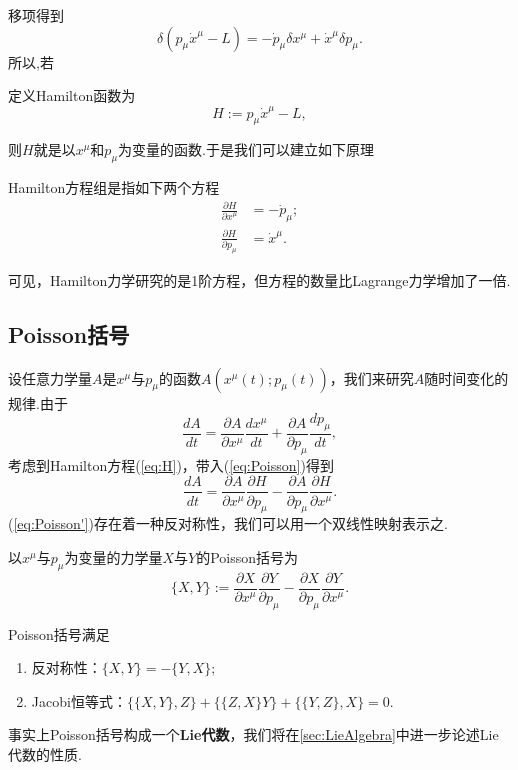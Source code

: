 		移项得到
		\begin{equation}\label{eq:delta H}
		\delta(p_\mu{\dot{x}}^\mu-L)=-{\dot{p}}_\mu\delta x^\mu+{\dot{x}}^\mu\delta p_\mu.
		\end{equation}
		所以,若
		\begin{definition}
		定义Hamilton函数为
		\begin{equation}
			H:=p_\mu{\dot{x}}^\mu-L,
		\end{equation}
		\end{definition}
		则$H$就是以$x^\mu$和$p_\mu$为变量的函数.于是我们可以建立如下原理
		\begin{theorem}
		Hamilton方程组是指如下两个方程
		\begin{equation}
			\begin{split}\label{eq:H}
				\frac{\partial H}{\partial x^\mu}&=-{\dot{p}}_\mu;\\
				\frac{\partial H}{\partial p_\mu}&={\dot{x}}^\mu.
			\end{split}
		\end{equation}
		\end{theorem}
		可见，Hamilton力学研究的是1阶方程，但方程的数量比Lagrange力学增加了一倍.
	
	\subsection{Poisson括号}
		设任意力学量$A$是$x^\mu$与$p_\mu$的函数$A(x^\mu(t);p_\mu(t))$，我们来研究$A$随时间变化的规律.由于
		\begin{equation}\label{eq:Poisson}
		\frac{dA}{dt}=\frac{\partial A}{\partial x^\mu}\frac{d x^\mu}{dt}+\frac{\partial A}{\partial p_\mu}\frac{dp_\mu}{dt},
		\end{equation}
		考虑到Hamilton方程(\ref{eq:H})，带入(\ref{eq:Poisson})得到
		\begin{equation}\label{eq:Poisson'}
		\frac{dA}{dt}=\frac{\partial A}{\partial x^\mu}\frac{\partial H}{\partial p_\mu}-\frac{\partial A}{\partial p_\mu}\frac{\partial H}{\partial x^\mu}.
		\end{equation}
		(\ref{eq:Poisson'})存在着一种反对称性，我们可以用一个双线性映射表示之.
		\begin{definition}
		以$x^\mu$与$p_\mu$为变量的力学量$X$与$Y$的Poisson括号为
		\begin{equation}\label{eq:PB}
			\{X,Y\}:=\frac{\partial X}{\partial x^\mu}\frac{\partial Y}{\partial p_\mu}-\frac{\partial X}{\partial p_\mu}\frac{\partial Y}{\partial x^\mu}.
		\end{equation}
		\end{definition}
		\begin{remark}
			Poisson括号满足
			\begin{enumerate}
				\item 反对称性：$\{X,Y\}=-\{Y,X\}$;
				\item Jacobi恒等式：$\{\{X,Y\},Z\}+\{\{Z,X\}Y\}+\{\{Y,Z\},X\}=0$.
			\end{enumerate}
			事实上Poisson括号构成一个\textbf{Lie代数}，我们将在\ref{sec:LieAlgebra}中进一步论述Lie代数的性质.
		\end{remark}
		
